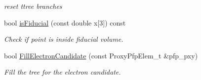 \begin{DoxyCompactItemize}
\begin{DoxyCompactList}\small\item\em reset ttree branches \end{DoxyCompactList}\item 
bool \hyperlink{classselection_1_1CCincSelection_adf6c627aacf355e0e4c8ff4df5716fee}{is\-Fiducial} (const double x\mbox{[}3\mbox{]}) const 
\begin{DoxyCompactList}\small\item\em Check if point is inside fiducial volume. \end{DoxyCompactList}\item 
bool \hyperlink{classselection_1_1CCincSelection_a4ca1d8fddbf5fa487b2904943197220a}{Fill\-Electron\-Candidate} (const Proxy\-Pfp\-Elem\-\_\-t \&pfp\-\_\-pxy)
\begin{DoxyCompactList}\small\item\em Fill the tree for the electron candidate. \end{DoxyCompactList}\end{DoxyCompactItemize}
